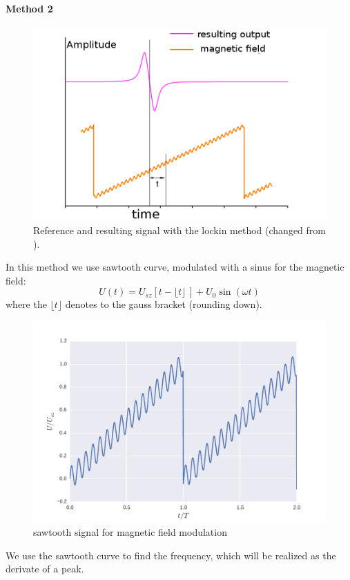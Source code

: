 \paragraph{Method 2} 
\begin{figure}[htpb]
    \centering
    \includegraphics[width=0.8\linewidth]{figures/lockin2}
    \caption{Reference and resulting signal with the lockin method
        (changed from \cite{ver}).}
    \label{fig:lockin2}
\end{figure}
In this method we use sawtooth curve, modulated
with a sinus for the magnetic field:
\begin{equation}
   U(t) = U_{sz} \left[ t - \lfloor t \rfloor \,  \right] + U_0 \sin(\omega t)
\end{equation}
where the $\lfloor t \rfloor$ denotes to the gauss bracket (rounding down). 
\begin{figure}[htpb]
    \centering
    \includegraphics[width=0.8\linewidth]{figures/sawtooth}
    \caption{sawtooth signal for magnetic field modulation}
    \label{fig:sawtooth}
\end{figure}
We use the sawtooth curve to find the frequency, which will be 
realized as the derivate of a peak.
